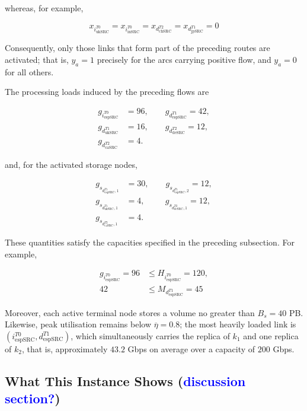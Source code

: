 \documentclass[a4paper,fleqn]{cas-dc}
\begin{document}
whereas, for example,

\[
x_{i_{\mathrm{ukSRC}}^{T0}}=x_{i_{\mathrm{inSRC}}^{T0}}=x_{d_{\mathrm{chSRC}}^{T2}}=x_{d_{\mathrm{jpSRC}}^{T1}}=0
\]

Consequently, only those links that form part of the preceding routes are activated; that is, \(y_a=1\) precisely for the arcs carrying positive flow, and \(y_a=0\) for all others.

The processing loads induced by the preceding flows are


\begin{align*}
g_{i_{\mathrm{espSRC}}^{T0}} &= 96, \qquad g_{d_{\mathrm{espSRC}}^{T1}} = 42, \\[1ex]
g_{d_{\mathrm{ukSRC}}^{T1}} &= 16, \qquad g_{d_{\mathrm{deSRC}}^{T2}} = 12, \\[1ex]
g_{d_{\mathrm{caSRC}}^{T2}} &= 4.
\end{align*}

and, for the activated storage nodes,

\begin{align*}
g_{s_{d_{\mathrm{espSRC}}^{T1},1}} &= 30, \qquad g_{s_{d_{\mathrm{espSRC}}^{T1},2}} = 12, \\[1ex]
g_{s_{d_{\mathrm{ukSRC}}^{T1},1}} &= 4, \qquad\ \ g_{s_{d_{\mathrm{deSRC}}^{T2},1}} = 12, \\[1ex]
g_{s_{d_{\mathrm{caSRC}}^{T2},1}} &= 4.
\end{align*}


These quantities satisfy the capacities specified in the preceding subsection. For example,

\begin{align*}
g_{i_{\mathrm{espSRC}}^{T0}} = 96 &\le H_{i_{\mathrm{espSRC}}^{T0}} = 120, \\[1ex]
42 &\le M_{d_{\mathrm{espSRC}}^{T1}} = 45
\end{align*}


Moreover, each active terminal node stores a volume no greater than \(B_s=40\) PB. Likewise, peak utilisation remains below \(\overline\eta=0.8\); the most heavily loaded link is \((i_{\mathrm{espSRC}}^{T0},d_{\mathrm{espSRC}}^{T1})\), which simultaneously carries the replica of \(k_1\) and one replica of \(k_2\), that is, approximately \(43.2\) Gbps on average over a capacity of \(200\) Gbps.


\subsection{What This Instance Shows (\textcolor{blue}{discussion section?})}
\end{document}
